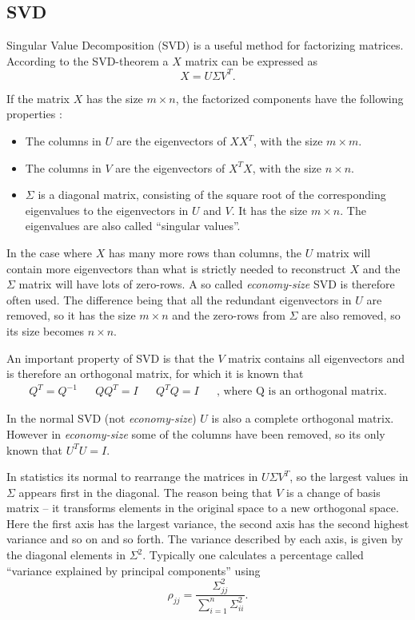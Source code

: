 \subsection{SVD}
Singular Value Decomposition (SVD) is a useful method for factorizing matrices. According to the SVD-theorem a $X$ matrix can be expressed as
\begin{equation}
X=U \Sigma V^{T}.
\label{eq:theory-svd}
\end{equation}

If the matrix $X$ has the size $m \times n$, the factorized components have the following properties \cite{introduction-to-data-mining}:
\begin{itemize}
\item The columns in $U$ are the eigenvectors of $X X^T$, with the size $m \times m$.
\item The columns in $V$ are the eigenvectors of $X^T X$, with the size $n \times n$.
\item $\Sigma$ is a diagonal matrix, consisting of the square root of the corresponding eigenvalues to the eigenvectors in $U$ and $V$.
It has the size $m \times n$. The eigenvalues are also called ``singular values''.
\end{itemize}

In the case where $X$ has many more rows than columns, the $U$ matrix will contain more eigenvectors than what is strictly needed to reconstruct $X$ and the $\Sigma$ matrix will have lots of zero-rows.
A so called \textit{economy-size} SVD is therefore often used.
The difference being that all the redundant eigenvectors in $U$ are removed, so it has the size $m \times n$ and the zero-rows from $\Sigma$ are also removed, so its size becomes $n \times n$.

An important property of SVD is that the $V$ matrix contains all eigenvectors and is therefore an orthogonal matrix, for which it is known that
\begin{align}
Q^T = Q^{-1} && Q Q^T = I && Q^T Q = I && \text{, where Q is an orthogonal matrix.}
\end{align}

In the normal SVD (not \textit{economy-size}) $U$ is also a complete orthogonal matrix.
However in \textit{economy-size} some of the columns have been removed, so its only known that $U^T U = I$.

In statistics its normal to rearrange the matrices in $U \Sigma V^T$, so the largest values in $\Sigma$ appears first in the diagonal.
The reason being that $V$ is a change of basis matrix -- it transforms elements in the original space to a new orthogonal space.
Here the first axis has the largest variance, the second axis has the second highest variance and so on and so forth.
The variance described by each axis, is given by the diagonal elements in $\Sigma^2$.
Typically one calculates a percentage called ``variance explained by principal components'' using
\begin{equation}
\rho_{jj} = \frac{\Sigma^2_{jj}}{\sum_{i=1}^n \Sigma^2_{ii}}.
\end{equation}

